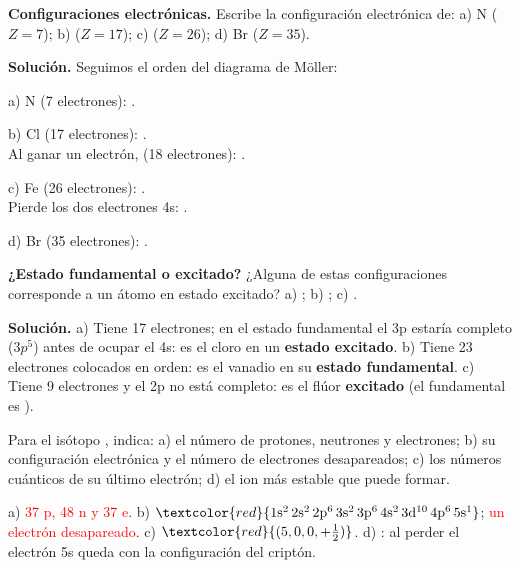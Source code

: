 \begin{example}
    \textbf{Configuraciones electrónicas.} Escribe la configuración electrónica de: a) N (\(Z = 7\)); b)  (\(Z = 17\));
    c)  (\(Z = 26\)); d) Br (\(Z = 35\)).

    \textbf{Solución.} Seguimos el orden del diagrama de Möller:

    a) N (7 electrones): .

    b) Cl (17 electrones): .\\
    Al ganar un electrón,  (18 electrones): .

    c) Fe (26 electrones): .\\
    Pierde los dos electrones 4s:  .

    d) Br (35 electrones): .
\end{example}

\begin{example}
    \textbf{¿Estado fundamental o excitado?} ¿Alguna de estas configuraciones corresponde a un átomo en estado excitado?
    a) ; b) ; c) .

    \textbf{Solución.} a) Tiene 17 electrones; en el estado fundamental el 3p estaría completo (\(3p^5\)) antes de ocupar el 4s:
    es el cloro en un \textbf{estado excitado}. b) Tiene 23 electrones colocados en orden: es el vanadio en su \textbf{estado
    fundamental}. c) Tiene 9 electrones y el 2p no está completo: es el flúor \textbf{excitado} (el fundamental es
    ).
\end{example}

\begin{exercise}
    Para el isótopo , indica: a) el número de protones, neutrones y electrones; b) su configuración electrónica y
    el número de electrones desapareados; c) los números cuánticos de su último electrón; d) el ion más estable que puede formar.
    \begin{solu}
        a) \textcolor{red}{37 p, 48 n y 37 e}. b) \(\textcolor{red}{\conf{1s^2\,2s^2\,2p^6\,3s^2\,3p^6\,4s^2\,3d^{10}\,4p^6\,5s^1}}\);
        \textcolor{red}{un electrón desapareado}. c) \(\textcolor{red}{(5, 0, 0, +\frac{1}{2})}\). d) \textcolor{red}{}:
        al perder el electrón 5s queda con la configuración del criptón.
    \end{solu}
\end{exercise}


